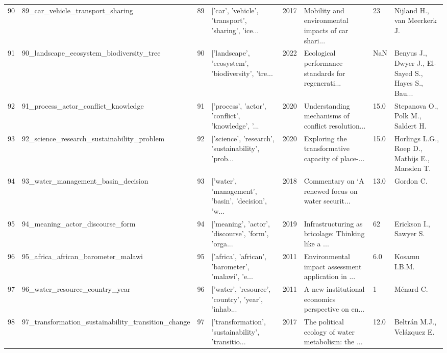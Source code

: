 \begin{tabular}{rlrlrlll}
         90 &                   89\_car\_vehicle\_transport\_sharing &        89 & ['car', 'vehicle', 'transport', 'sharing', 'ice... &          2017 & Mobility and environmental impacts of car shari... &      23 &                        Nijland H., van Meerkerk J. \\
         91 &           90\_landscape\_ecosystem\_biodiversity\_tree &        90 & ['landscape', 'ecosystem', 'biodiversity', 'tre... &          2022 & Ecological performance standards for regenerati... &     NaN & Benyus J., Dwyer J., El-Sayed S., Hayes S., Bau... \\
         92 &                91\_process\_actor\_conflict\_knowledge &        91 & ['process', 'actor', 'conflict', 'knowledge', '... &          2020 & Understanding mechanisms of conflict resolution... &    15.0 &                  Stepanova O., Polk M., Saldert H. \\
         93 &         92\_science\_research\_sustainability\_problem &        92 & ['science', 'research', 'sustainability', 'prob... &          2020 & Exploring the transformative capacity of place-... &    15.0 &     Horlings L.G., Roep D., Mathijs E., Marsden T. \\
         94 &                 93\_water\_management\_basin\_decision &        93 & ['water', 'management', 'basin', 'decision', 'w... &          2018 & Commentary on ‘A renewed focus on water securit... &    13.0 &                                          Gordon C. \\
         95 &                    94\_meaning\_actor\_discourse\_form &        94 & ['meaning', 'actor', 'discourse', 'form', 'orga... &          2019 & Infrastructuring as bricolage: Thinking like a ... &      62 &                             Erickson I., Sawyer S. \\
         96 &                 95\_africa\_african\_barometer\_malawi &        95 & ['africa', 'african', 'barometer', 'malawi', 'e... &          2011 & Environmental impact assessment application in ... &     6.0 &                                      Kosamu I.B.M. \\
         97 &                     96\_water\_resource\_country\_year &        96 & ['water', 'resource', 'country', 'year', 'inhab... &          2011 & A new institutional economics perspective on en... &       1 &                                          Ménard C. \\
         98 & 97\_transformation\_sustainability\_transition\_change &        97 & ['transformation', 'sustainability', 'transitio... &          2017 & The political ecology of water metabolism: the ... &    12.0 &                         Beltrán M.J., Velázquez E. \\

\end{tabular}
